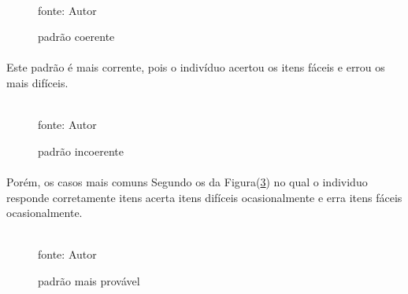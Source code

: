 	\begin{figure}[!h]
		\centering
		\caption{padrão coerente}
		\\
		fonte: Autor
		\label{fig:coerente}
	\end{figure}
	\paragraph{}
	    Este padrão é mais corrente, pois o indivíduo acertou os itens fáceis e errou os mais difíceis.
	\begin{figure}[!h]
		\centering
		\caption{padrão incoerente}
		\\
		fonte: Autor
		\label{fig:incoerente}
	\end{figure}
	\paragraph{}
	    Porém, os casos mais comuns Segundo os da Figura(\ref{fig:coerenciax}) no qual o individuo responde corretamente itens acerta itens difíceis ocasionalmente e erra itens fáceis ocasionalmente.
	\begin{figure}[!h]
		\centering
		\caption{padrão mais provável}
		\\
		fonte: Autor
		\label{fig:coerenciax}
	\end{figure}
